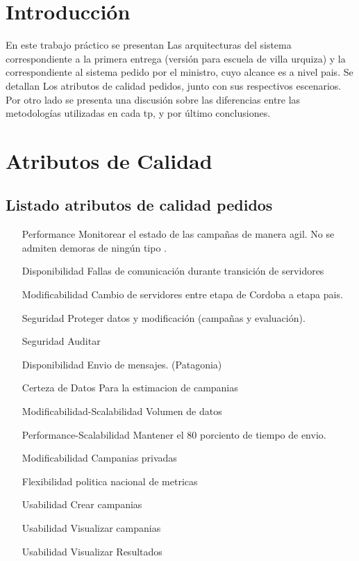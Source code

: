 \documentclass[a4paper, 11pt]{article}
\begin{document}
\pagestyle{myheadings}
\maketitle

\thispagestyle{empty}
\tableofcontents

\newpage

\section{Introducci\'on}

En este trabajo práctico se presentan Las arquitecturas del sistema correspondiente a la primera entrega (versión para escuela de villa urquiza) y la correspondiente al sistema pedido por el ministro, cuyo alcance es a nivel pais.
Se detallan Los atributos de calidad pedidos, junto con sus respectivos escenarios. Por otro lado se presenta una discusión sobre las diferencias entre las metodologías utilizadas en cada tp, y por último conclusiones.
\newpage
\section{Atributos de Calidad}
\subsection{Listado atributos de calidad pedidos}
\begin{itemize}
\item[Performance] Monitorear el estado de las campañas de manera agil. No se admiten demoras de ningún tipo .
\item[Disponibilidad] Fallas de comunicación durante transición de servidores
\item[Modificabilidad] Cambio de servidores entre etapa de Cordoba a etapa pais.
\item[Seguridad]Proteger datos y modificación (campañas y evaluación).
\item[Seguridad]Auditar
\item[Disponibilidad] Envio de mensajes. (Patagonia)
\item[Certeza de Datos] Para la estimacion de campanias
\item[Modificabilidad-Scalabilidad] Volumen de datos
\item[Performance-Scalabilidad] Mantener el 80 porciento de tiempo de envio.
\item[Modificabilidad] Campanias privadas
\item[Flexibilidad] politica nacional de metricas
\item[Usabilidad] Crear campanias
\item[Usabilidad] Visualizar campanias
\item[Usabilidad] Visualizar Resultados
\end{itemize}
\end{document}

